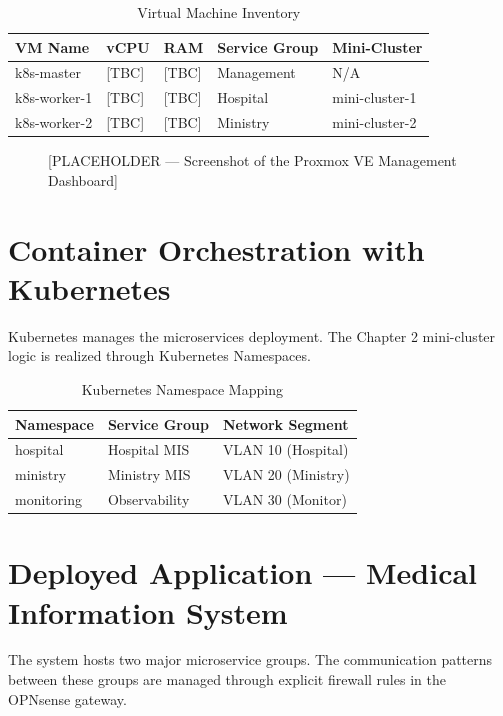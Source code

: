 \documentclass[12pt,a4paper]{report}
\begin{document}
\begin{table}[htbp]
\centering
\caption{Virtual Machine Inventory}
\label{tab:vm_inv}
\begin{tabular}{@{}lllll@{}}
\toprule
\textbf{VM Name} & \textbf{vCPU} & \textbf{RAM} & \textbf{Service Group} & \textbf{Mini-Cluster} \\ \midrule
k8s-master & [TBC] & [TBC] & Management & N/A \\
k8s-worker-1 & [TBC] & [TBC] & Hospital & mini-cluster-1 \\
k8s-worker-2 & [TBC] & [TBC] & Ministry & mini-cluster-2 \\ \bottomrule
\end{tabular}
\end{table}

\begin{figure}[htbp]
\centering
\fbox{\rule{0pt}{5cm}\rule{0.9\linewidth}{0pt}}
\caption{[PLACEHOLDER — Screenshot of the Proxmox VE Management Dashboard]}
\label{fig:proxmox_dashboard}
\end{figure}

\section{Container Orchestration with Kubernetes}

Kubernetes manages the microservices deployment. The Chapter 2 mini-cluster logic is realized through Kubernetes Namespaces.

\begin{table}[htbp]
\centering
\caption{Kubernetes Namespace Mapping}
\label{tab:k8s_ns}
\begin{tabular}{@{}lll@{}}
\toprule
\textbf{Namespace} & \textbf{Service Group} & \textbf{Network Segment} \\ \midrule
hospital & Hospital MIS & VLAN 10 (Hospital) \\
ministry & Ministry MIS & VLAN 20 (Ministry) \\
monitoring & Observability & VLAN 30 (Monitor) \\ \bottomrule
\end{tabular}
\end{table}

\section{Deployed Application — Medical Information System}

The system hosts two major microservice groups. The communication patterns between these groups are managed through explicit firewall rules in the OPNsense gateway.
\end{document}
